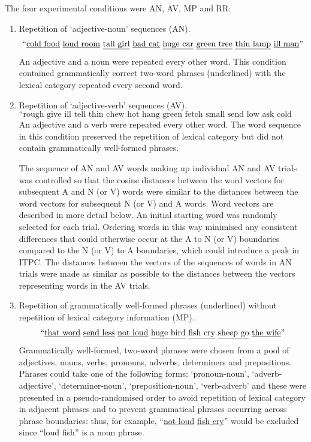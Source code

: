 \documentclass[10pt,letterpaper]{article}
\begin{document}
The four experimental conditions were AN, AV, MP and RR:
\begin{enumerate}
\item Repetition of `adjective-noun' sequences (AN). 
\[
\label{eq:AN}
\text{``\underline{cold food} \underline{loud room} \underline{tall girl} \underline{bad cat} \underline{huge car} \underline{green tree} \underline{thin lamp} \underline{ill man}''}
\]
An adjective and a noun were repeated every other word. This condition contained grammatically correct two-word phrases (underlined) with the lexical category repeated every second word.

\item Repetition of `adjective-verb' sequences (AV).
\[
\label{eq:AV}
\text{``rough give ill tell thin chew hot hang green fetch small send low ask cold weep''}
\]
An adjective and a verb were repeated every other word. The word sequence in this condition preserved the repetition of lexical category but did not contain grammatically well-formed phrases.

The sequence of AN and AV words making up individual AN and AV trials was controlled so that the cosine distances between the word vectors for subsequent A and N (or V) words were similar to the distances between the word vectors for subsequent N (or V) and A words. Word vectors are described in more detail below. An initial starting word was randomly selected for each trial. Ordering words in this way minimised any consistent differences that could otherwise occur at the A to N (or V) boundaries compared to the N (or V) to A boundaries, which could introduce a peak in ITPC. The distances between the vectors of the sequences of words in AN trials were made as similar as possible to the distances between the vectors representing words in the AV trials.

\item Repetition of grammatically well-formed phrases (underlined) without repetition of lexical category information (MP).
\[
\label{eq:MP}
\text{``\underline{that word} \underline{send less} \underline{not loud} \underline{huge bird} \underline{fish cry} \underline{sheep go} \underline{the wife}''}
\]
Grammatically well-formed, two-word phrases were chosen from a pool of adjectives, nouns, verbs, pronouns, adverbs, determiners and prepositions. Phrases could take one of the following forms: `pronoun-noun', `adverb-adjective', `determiner-noun', `preposition-noun',  `verb-adverb' and these were presented in a pseudo-randomised order to avoid repetition of lexical category in adjacent phrases and to prevent grammatical phrases occurring across phrase boundaries: thus, for example, ``\underline{not loud} \underline{fish cry}'' would be excluded since ``loud fish'' is a noun phrase.


\end{enumerate}
\end{document}
